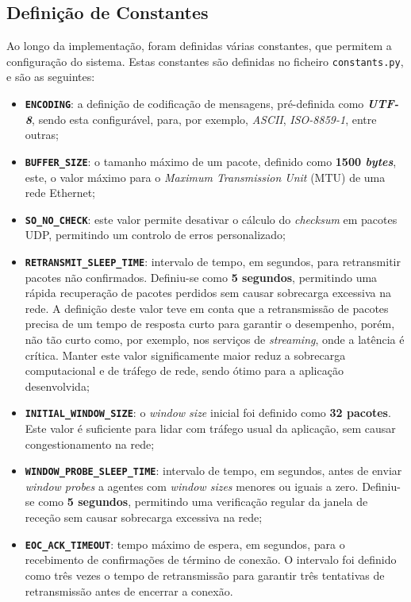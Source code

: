 \documentclass[a4paper,12pt]{scrreprt}
\begin{document}
\subsection{Definição de Constantes}

Ao longo da implementação, foram definidas várias constantes, que permitem a
configuração do sistema. Estas constantes são definidas no ficheiro \texttt{constants.py},
e são as seguintes:

\begin{itemize}
    \item \textbf{\texttt{ENCODING}}: a definição de codificação de mensagens, pré-definida como \textbf{\textit{UTF-8}},
    sendo esta configurável, para, por exemplo, \textit{ASCII}, \textit{ISO-8859-1}, entre outras;
    \item \textbf{\texttt{BUFFER\_SIZE}}: o tamanho máximo de um pacote, definido como \textbf{1500 \textit{bytes}},
    este, o valor máximo para o \textit{Maximum Transmission Unit} (MTU) de uma rede Ethernet;
    \item \textbf{\texttt{SO\_NO\_CHECK}}: este valor permite desativar o cálculo do \textit{checksum} em
    pacotes UDP, permitindo um controlo de erros personalizado;
    \item \textbf{\texttt{RETRANSMIT\_SLEEP\_TIME}}: intervalo de tempo, em segundos, para retransmitir pacotes não confirmados.
    Definiu-se como \textbf{5 segundos}, permitindo uma rápida recuperação de pacotes perdidos sem causar sobrecarga excessiva na rede.
    A definição deste valor teve em conta que a retransmissão de pacotes precisa de um tempo de resposta curto para garantir
    o desempenho, porém, não tão curto como, por exemplo, nos serviços de \textit{streaming}, onde a latência é crítica.
    Manter este valor significamente maior reduz a sobrecarga computacional e de tráfego de rede, sendo ótimo para a aplicação desenvolvida;
    \item \textbf{\texttt{INITIAL\_WINDOW\_SIZE}}: o \textit{window size} inicial foi definido como \textbf{32 pacotes}.
    Este valor é suficiente para lidar com tráfego usual da aplicação, sem causar congestionamento na rede;
    \item \textbf{\texttt{WINDOW\_PROBE\_SLEEP\_TIME}}: intervalo de tempo, em segundos, antes de enviar \textit{window probes}
    a agentes com \textit{window sizes} menores ou iguais a zero.
    Definiu-se como \textbf{5 segundos}, permitindo uma verificação regular da janela de receção sem causar sobrecarga excessiva na rede;
    \item \textbf{\texttt{EOC\_ACK\_TIMEOUT}}: tempo máximo de espera, em segundos, para o recebimento de confirmações de término de conexão.
    O intervalo foi definido como três vezes o tempo de retransmissão para garantir três tentativas de retransmissão antes de encerrar a conexão.
\end{itemize}
\end{document}
